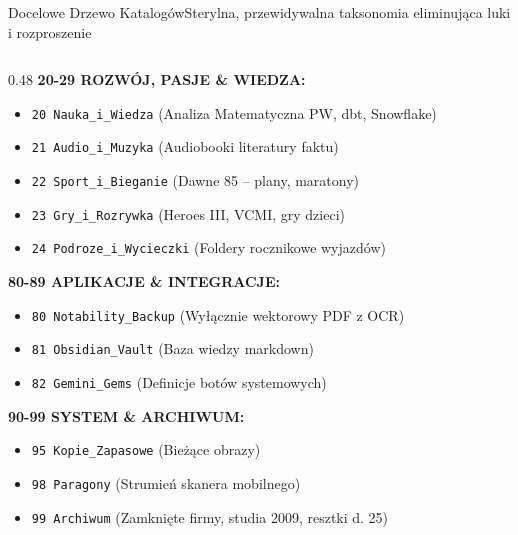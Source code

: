 \documentclass[aspectratio=169, 10pt]{beamer}
\begin{document}
\begin{frame}{Docelowe Drzewo Katalogów}{Sterylna, przewidywalna taksonomia eliminująca luki i rozproszenie}
\begin{columns}[T]
    \begin{column}{0.48\textwidth}
      \scriptsize
      \textbf{20-29 ROZWÓJ, PASJE \& WIEDZA:}
      \begin{itemize}\tiny
        \item \texttt{20 Nauka\_i\_Wiedza} (Analiza Matematyczna PW, dbt, Snowflake)
        \item \texttt{21 Audio\_i\_Muzyka} (Audiobooki literatury faktu)
        \item \texttt{22 Sport\_i\_Bieganie} (Dawne 85 -- plany, maratony)
        \item \texttt{23 Gry\_i\_Rozrywka} (Heroes III, VCMI, gry dzieci)
        \item \texttt{24 Podroze\_i\_Wycieczki} (Foldery rocznikowe wyjazdów)
      \end{itemize}

      \textbf{80-89 APLIKACJE \& INTEGRACJE:}
      \begin{itemize}\tiny
        \item \texttt{80 Notability\_Backup} (Wyłącznie wektorowy PDF z OCR)
        \item \texttt{81 Obsidian\_Vault} (Baza wiedzy markdown)
        \item \texttt{82 Gemini\_Gems} (Definicje botów systemowych)
      \end{itemize}

      \textbf{90-99 SYSTEM \& ARCHIWUM:}
      \begin{itemize}\tiny
        \item \texttt{95 Kopie\_Zapasowe} (Bieżące obrazy)
        \item \texttt{98 Paragony} (Strumień skanera mobilnego)
        \item \texttt{99 Archiwum} (Zamknięte firmy, studia 2009, resztki d. 25)
      \end{itemize}
    \end{column}
  \end{columns}
\end{frame}
\end{document}
